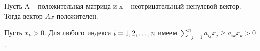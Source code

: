 


\begin{propose}\label{cha:30/propose:1}
	Пусть A – положительная матрица и x – неотрицательный ненулевой вектор. Тогда вектор $Ax$ положителен.
\end{propose}
\begin{Proof}
	Пусть $x_k > 0$. Для любого индекса $i = 1,2,\dots,n$ имеем $\underset{j=1}{\overset{n}{\sum}} a_{ij}x_j \ge a_{ik}x_k > 0$.
\end{Proof}

